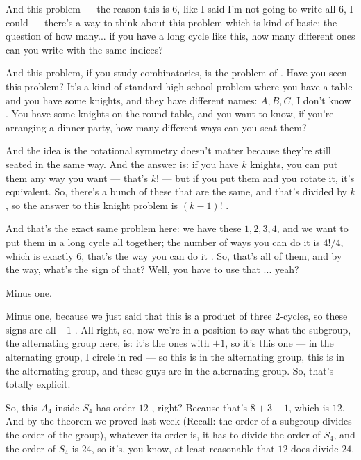 \begin{speech}[00:38:01 - 00:39:33]
And this problem --- the reason this is $6$, like I said I'm not going to write all $6$, I could --- there's a way to think about this problem which is kind of basic: the question of how many... if you have a long cycle like this, how many different ones can you write with the same indices?

And this problem, if you study combinatorics, is the problem of . Have you seen this problem? It's a kind of standard high school problem where you have a table and you have some knights, and they have different names: $A, B, C$, I don't know . You have some knights on the round table, and you want to know, if you're arranging a dinner party, how many different ways can you seat them?

And the idea is the rotational symmetry doesn't matter because they're still seated in the same way. And the answer is: if you have $k$ knights, you can put them any way you want --- that's $k!$ --- but if you put them and you rotate it, it's equivalent. So, there's a bunch of these that are the same, and that's divided by $k$, so the answer to this knight problem is $(k-1)!$ .

And that's the exact same problem here: we have these $1, 2, 3, 4$, and we want to put them in a long cycle all together; the number of ways you can do it is $4! / 4$, which is exactly $6$, that's the way you can do it . So, that's all of them, and by the way, what's the sign of that? Well, you have to use that ... yeah?
\end{speech}

\begin{student}
Minus one.
\end{student}

\begin{speech}[00:39:34 - 00:40:28]
Minus one, because we just said that this is a product of three $2$-cycles, so these signs are all $-1$ . All right, so, now we're in a position to say what the subgroup, the alternating group here, is: it's the ones with $+1$, so it's this one --- in the alternating group, I circle in red  --- so this is in the alternating group, this is in the alternating group, and these guys are in the alternating group. So, that's totally explicit.

So, this $A_4$ inside $S_4$ has order $12$ , right? Because that's $8 + 3 + 1$, which is $12$. And by the theorem we proved last week (Recall: the order of a subgroup divides the order of the group), whatever its order is, it has to divide the order of $S_4$, and the order of $S_4$ is $24$, so it's, you know, at least reasonable that $12$ does divide $24$.
\end{speech}

